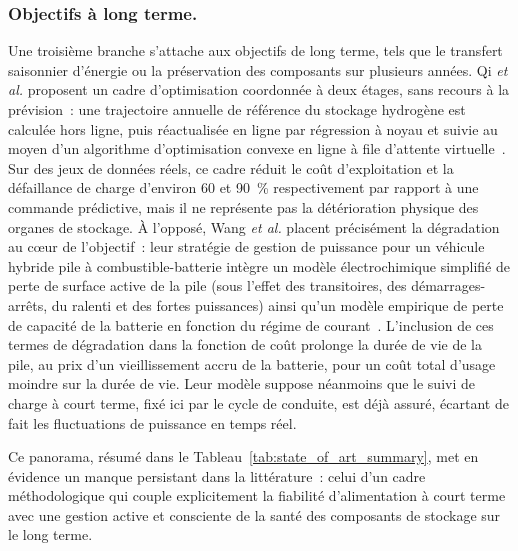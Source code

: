 \subsubsection{Objectifs à long terme.}
Une troisième branche s'attache aux objectifs de long terme, tels que le transfert saisonnier d'énergie ou la préservation des composants sur plusieurs années.
Qi \textit{et al.} proposent un cadre d'optimisation coordonnée à deux étages, sans recours à la prévision~: une trajectoire annuelle de référence du stockage hydrogène est calculée hors ligne, puis réactualisée en ligne par régression à noyau et suivie au moyen d'un algorithme d'optimisation convexe en ligne à file d'attente virtuelle~\cite{qi_long_term_2025}.
Sur des jeux de données réels, ce cadre réduit le coût d'exploitation et la défaillance de charge d'environ 60 et 90~\% respectivement par rapport à une commande prédictive, mais il ne représente pas la détérioration physique des organes de stockage.
À l'opposé, Wang \textit{et al.} placent précisément la dégradation au c\oe{}ur de l'objectif~: leur stratégie de gestion de puissance pour un véhicule hybride pile à combustible-batterie intègre un modèle électrochimique simplifié de perte de surface active de la pile (sous l'effet des transitoires, des démarrages-arrêts, du ralenti et des fortes puissances) ainsi qu'un modèle empirique de perte de capacité de la batterie en fonction du régime de courant~\cite{wang_power_2019}.
L'inclusion de ces termes de dégradation dans la fonction de coût prolonge la durée de vie de la pile, au prix d'un vieillissement accru de la batterie, pour un coût total d'usage moindre sur la durée de vie.
Leur modèle suppose néanmoins que le suivi de charge à court terme, fixé ici par le cycle de conduite, est déjà assuré, écartant de fait les fluctuations de puissance en temps réel.

Ce panorama, résumé dans le Tableau~\ref{tab:state_of_art_summary}, met en évidence un manque persistant dans la littérature~: celui d'un cadre méthodologique qui couple explicitement la fiabilité d'alimentation à court terme avec une gestion active et consciente de la santé des composants de stockage sur le long terme.

